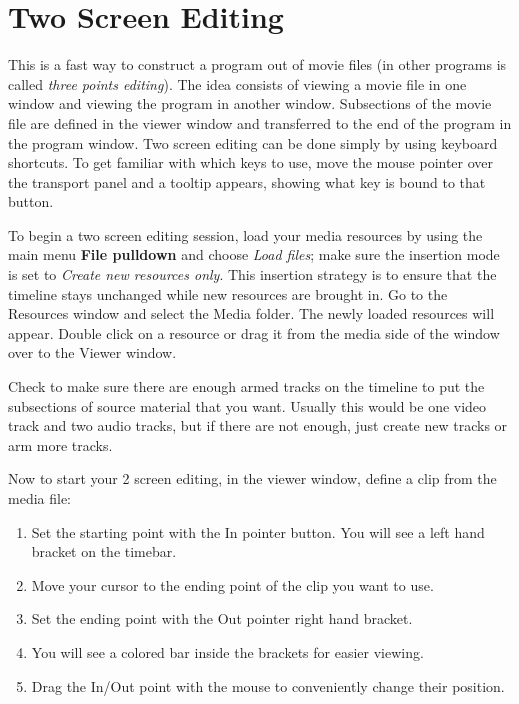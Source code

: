 \section{Two Screen Editing}%
\label{sec:two_screen_editing}

This is a fast way to construct a program out of movie files (in
other programs is called \textit{three points editing}). The idea
consists of viewing a movie file in one window and viewing the
program in another window. Subsections of the movie file are defined
in the viewer window and transferred to the end of the program in
the program window.  Two screen editing can be done simply by using
keyboard shortcuts.  To get familiar with which keys to use, move
the mouse pointer over the transport panel and a tooltip appears,
showing what key is bound to that button.

To begin a two screen editing session, load your media resources by
using the main menu \textbf{File pulldown} and choose \textit{Load
  files}; make sure the insertion mode is set to \textit{Create new
  resources only}.  This insertion strategy is to ensure that the
timeline stays unchanged while new resources are brought in. Go to
the Resources window and select the Media folder. The newly loaded
resources will appear. Double click on a resource or drag it from
the media side of the window over to the Viewer window.

Check to make sure there are enough armed tracks on the timeline to
put the subsections of source material that you want.  Usually this
would be one video track and two audio tracks, but if there are not
enough, just create new tracks or arm more tracks.

Now to start your 2 screen editing, in the viewer window, define a
clip from the media file:

\begin{enumerate}
\item Set the starting point with the In pointer button.  You
  will see a left hand bracket on the timebar.
\item Move your cursor to the ending point of the clip you want
  to use.
\item Set the ending point with the Out pointer right hand
  bracket.
\item You will see a colored bar inside the brackets for easier
  viewing.
\item Drag the In/Out point with the mouse to conveniently
  change their position.
\end{enumerate}

